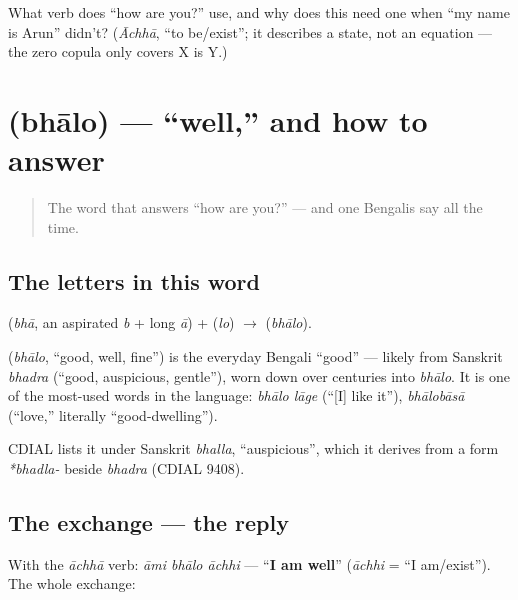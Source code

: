 \begin{tcolorbox}[breakable,colback=teal!4,colframe=teal!35!black,title={Before you move on}]
What verb does \textquotedblleft{}how are you?\textquotedblright{} use, and why does this need one when \textquotedblleft{}my name is Arun\textquotedblright{} didn't? (\emph{Āchhā}, \textquotedblleft{}to be/exist\textquotedblright{}; it describes a state, not an equation — the zero copula only covers X is Y.)
\end{tcolorbox}
\section[\texorpdfstring{\bn{ভালো} (bhālo)}{ভালো (bhālo)}]{ (bhālo) — \textquotedblleft{}well,\textquotedblright{} and how to answer}

\label{lesson:BN-C03-bhalo}



\begin{quote}
The word that answers \textquotedblleft{}how are you?\textquotedblright{} — and one Bengalis say all the time.
\end{quote}

\subsection*{The letters in this word}
\textbf{} (\emph{bhā}, an aspirated \emph{b} + long \emph{ā}) + \textbf{} (\emph{lo}) $\to$ \textbf{} (\emph{bhālo}).

\begin{cousinweb}
\textbf{} (\emph{bhālo}, \textquotedblleft{}good, well, fine\textquotedblright{}) is the everyday Bengali \textquotedblleft{}good\textquotedblright{} — likely from Sanskrit \emph{bhadra} (\textquotedblleft{}good, auspicious, gentle\textquotedblright{}), worn down over centuries into \emph{bhālo}. It is one of the most-used words in the language: \emph{bhālo lāge} (\textquotedblleft{}{[}I{]} like it\textquotedblright{}), \emph{bhālobāsā} (\textquotedblleft{}love,\textquotedblright{} literally \textquotedblleft{}good-dwelling\textquotedblright{}).

CDIAL lists it under Sanskrit \emph{bhalla}, \textquotedblleft{}auspicious\textquotedblright{}, which it derives from a form \emph{*bhadla-} beside \emph{bhadra} (CDIAL 9408).
\end{cousinweb}

\subsection*{The exchange — the reply}
With the \emph{āchhā} verb: \emph{āmi bhālo āchhi} — \textquotedblleft{}\textbf{I am well}\textquotedblright{} (\emph{āchhi} = \textquotedblleft{}I am/exist\textquotedblright{}). The whole exchange:

